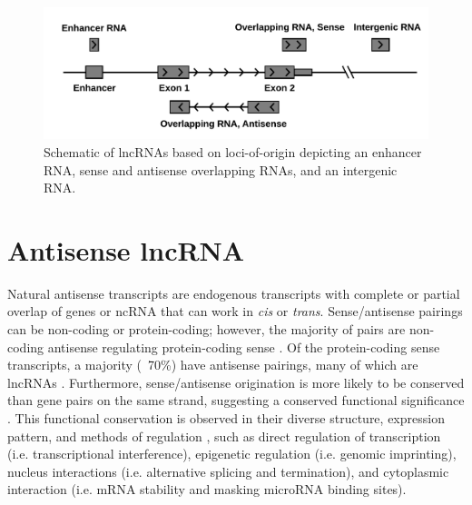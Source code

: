 {%
\begin{figure}%
\centering
\includegraphics[scale=0.85]{figures/lncRNAs2.pdf}
\caption{Schematic of lncRNAs based on loci-of-origin depicting an enhancer RNA, sense and antisense overlapping RNAs, and an intergenic RNA.}
\label{Figure 1-4: }
\end{figure}

\section{Antisense lncRNA}

Natural antisense transcripts are endogenous transcripts with complete or partial overlap of genes or ncRNA that can work in \textit{cis} or \textit{trans}. Sense/antisense pairings can be non-coding or protein-coding; however, the majority of pairs are non-coding antisense regulating protein-coding sense \cite{Katayama2005}. Of the protein-coding sense transcripts, a majority (~70\%) have antisense pairings, many of which are lncRNAs \cite{Beiter2009,Carlile2009}. Furthermore, sense/antisense origination is more likely to be conserved than gene pairs on the same strand, suggesting a conserved functional significance \cite{Dahary2005}. This functional conservation is observed in their diverse structure, expression pattern, and methods of regulation \cite{Pelechano2013}, such as direct regulation of transcription (i.e. transcriptional interference), epigenetic regulation (i.e. genomic imprinting), nucleus interactions (i.e. alternative splicing and termination), and cytoplasmic interaction (i.e. mRNA stability and masking microRNA binding sites).

}
